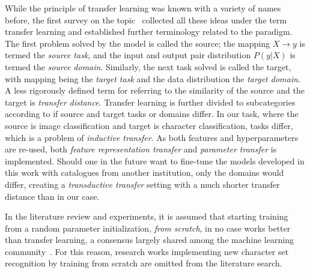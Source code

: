 \documentclass[english,twoside,openright]{UH_DS_MSc}
\begin{document}
While the principle of transfer learning was known with a variety of names before, the first survey on  the topic~\cite{transferlearning_survey} collected all these ideas under the term transfer learning and established further terminology related to the paradigm. The first problem solved by the model is called the source;
the mapping $X\to y$ is termed the \textit{source task}, and the input and output pair distribution $P(y|X)$ is termed the \textit{source domain}.
Similarly, the next task solved is called the target, with mapping being the \textit{target task} and the data distribution the \textit{target domain}.
A less rigorously defined term for referring to the similarity of the source and the target is \textit{transfer distance}. Transfer learning is further divided to subcategories according to if source and target tasks or domains differ. In our task, where the source is image classification and target is character classification, tasks differ, which is a problem of \textit{inductive transfer}.
As both features and hyperparameters are re-used, both \textit{feature representation transfer} and \textit{parameter transfer} is implemented. Should one in the future want to fine-tune the models 
developed in this work with catalogues from another institution, only the domains would differ, creating a \textit{transductive transfer} setting with a much shorter transfer distance than in our case.

In the literature review and experiments, it is assumed that starting training from a random parameter initialization, \textit{from scratch}, in no case works 
better than transfer learning, a consensus largely shared among the machine learning community~\cite{cs231n_transfer_learning}.
For this reason, research works implementing new character set recognition by training from scratch are omitted from the literature search.
\end{document}
